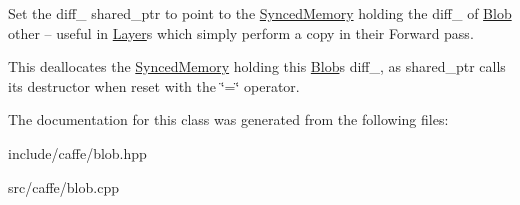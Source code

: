 Set the diff\+\_\+ shared\+\_\+ptr to point to the \hyperlink{classcaffe_1_1SyncedMemory}{Synced\+Memory} holding the diff\+\_\+ of \hyperlink{classcaffe_1_1Blob}{Blob} other -- useful in \hyperlink{classcaffe_1_1Layer}{Layer}s which simply perform a copy in their Forward pass. 

This deallocates the \hyperlink{classcaffe_1_1SyncedMemory}{Synced\+Memory} holding this \hyperlink{classcaffe_1_1Blob}{Blob}\textquotesingle{}s diff\+\_\+, as shared\+\_\+ptr calls its destructor when reset with the \char`\"{}=\char`\"{} operator. 

The documentation for this class was generated from the following files\+:\begin{DoxyCompactItemize}
\item 
include/caffe/blob.\+hpp\item 
src/caffe/blob.\+cpp\end{DoxyCompactItemize}
